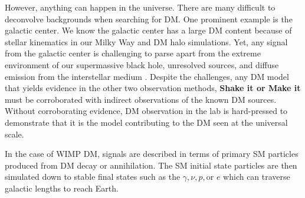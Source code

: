 \begin{figure}[ht]
\end{figure}

However, anything can happen in the universe.
There are many difficult to deconvolve backgrounds when searching for DM.
One prominent example is the galactic center.
We know the galactic center has a large DM content because of stellar kinematics in our Milky Way and DM halo simulations.
Yet, any signal from the galactic center is challenging to parse apart from the extreme environment of our supermassive black hole, unresolved sources, and diffuse emission from the interstellar medium \cite{Tracy:les_houches}.
Despite the challenges, any DM model that yields evidence in the other two observation methods, \textbf{Shake it or Make it} must be corroborated with indirect observations of the known DM sources.
Without corroborating evidence, DM observation in the lab is hard-pressed to demonstrate that it is the model contributing to the DM seen at the universal scale.

In the case of WIMP DM, signals are described in terms of primary SM particles produced from DM decay or annihilation.
The SM initial state particles are then simulated down to stable final states such as the $\gamma, \nu, p, \text{or } e$ which can traverse galactic lengths to reach Earth.

